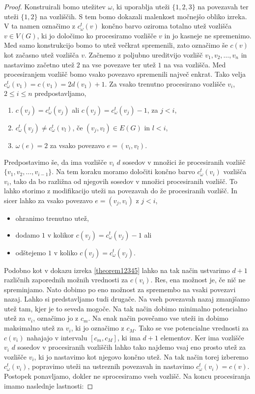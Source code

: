 \documentclass[12pt,a4paper,twoside]{article}
\theoremstyle{definition} %
\theoremstyle{plain} %
\numberwithin{equation}{section}  %
\begin{document}
\begin{proof}
Konstruirali bomo utežitev $\omega$, ki uporablja uteži $\{1,2,3\}$ na povezavah ter uteži $\{1,2\}$ na vozliščih. S tem bomo dokazali malenkost močnejšo obliko izreka. V ta namen označimo z $c_{\omega}^t(v)$ končno barvo oziroma totalno utež vozlišča $v \in V(G)$, ki jo določimo ko procesiramo vozlišče $v$ in jo kasneje ne spremenimo. Med samo konstrukcijo bomo to utež večkrat spremenili, zato označimo še $c(v)$ kot začasno utež vozlišča $v$. Začnemo z poljubno ureditvijo vozlišč $v_1, v_2, \ldots, v_n$ in nastavimo začetno utež $2$ na vse povezave ter utež $1$ na vsa vozlišča. Med procesiranjem vozlišč bomo vsako povezavo spremenili največ enkrat. Tako velja $c_{\omega}^t(v_1) = c(v_1) = 2d(v_1) + 1$. Za vsako trenutno procesirano vozlišče $v_i$, $2\le i \le n$ predpostavljamo,
\begin{enumerate}
\item $c(v_j) = c_{\omega}^t(v_j) $ ali $c(v_j) = c_{\omega}^t(v_j)  - 1$, za $j < i$,
\item $c_{\omega}^t(v_j) \neq c_{\omega}^t(v_l)$, če $(v_j,v_l) \in E(G)$ in $l < i$,
\item $\omega(e) = 2$ za vsako povezavo $e = (v_i, v_l)$.
\end{enumerate}
Predpostavimo še, da ima vozlišče $v_i$ $d$ sosedov v množici že procesiranih vozlišč $\{v_1, v_2, \ldots, v_{i-1}\}$. Na tem koraku moramo določiti končno barvo $c_{\omega}^t(v_i)$ vozlišča $v_i$, tako da bo razližna od njegovih sosedov v množici procesiranih vozlišč. To lahko storimo z modifikacijo uteži na povezavah do že procesiranih vozlišč. In sicer lahko za vsako povezavo $e = (v_j, v_i)$ z $j < i$,
\begin{itemize}
\item ohranimo trenutno utež,
\item dodamo $1$ v kolikor $c(v_j) = c_{\omega}^t(v_j)   - 1$ ali
\item odštejemo $1$ v koliko $c(v_j) = c_{\omega}^t(v_j) $.
\end{itemize}
Podobno kot v dokazu izreka \ref{theorem12345} lahko na tak način ustvarimo $d+1$ različnih zaporednih možnih vrednosti za $c(v_i)$. Res, ena možnost je, če nič ne spreminjamo. Nato dobimo po eno možnost za spremembo na vsaki povezavi nazaj. Lahko si predstavljamo tudi drugače. Na vseh povezavah nazaj zmanjšamo utež tam, kjer je to seveda mogoče. Na tak način dobimo minimalno potencialno utež za $v_i$, označimo jo z  $c_m$. Na enak način povečamo vse uteži in dobimo maksimalno utež za $v_i$, ki jo označimo z $c_M$. Tako se vse potencialne vrednosti za $c(v_i)$ nahajajo v intervalu $[c_m, c_M]$, ki ima $d+1$ elementov. Ker ima vozlišče $v_i$ $d$ sosedov v procesiranih vozliščih lahko tako najdemo vsaj eno prosto utež za vozlišče $v_i$, ki jo nastavimo kot njegovo končno utež. Na tak način torej izberemo $c_{\omega}^t(v_i)$, popravimo uteži na ustreznih povezavah in nastavimo $c_{\omega}^t(v_i) = c(v)$. Postopek ponavljamo, dokler ne sprocesiramo vseh vozlišč. Na koncu procesiranja imamo naslednje lastnosti:

\end{proof}
\end{document}
